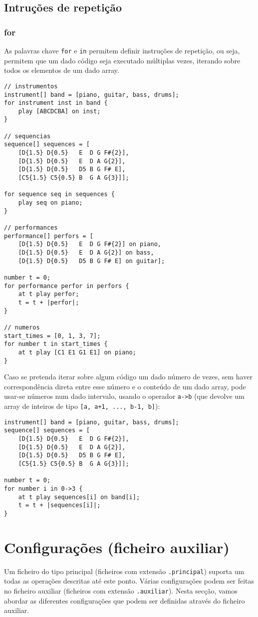 \documentclass{article}
\begin{document}
\subsection{Intruções de repetição}
\subsubsection{for}
As palavras chave \texttt{for} e \texttt{in} permitem definir instruções de repetição, ou seja, permitem que um dado código seja executado múltiplas vezes, iterando sobre todos os elementos de um dado array.
\begin{lstlisting} 
// instrumentos 
instrument[] band = [piano, guitar, bass, drums];
for instrument inst in band {
    play [ABCDCBA] on inst;
}

// sequencias
sequence[] sequences = [
    [D{1.5} D{0.5}   E  D G F#{2}], 
    [D{1.5} D{0.5}   E  D A G{2}],
    [D{1.5} D{0.5}   D5 B G F# E],
    [C5{1.5} C5{0.5} B  G A G{3}]];
    
for sequence seq in sequences {
    play seq on piano;
}
    
// performances
performance[] perfors = [
    [D{1.5} D{0.5}   E  D G F#{2}] on piano, 
    [D{1.5} D{0.5}   E  D A G{2}] on bass,
    [D{1.5} D{0.5}   D5 B G F# E] on guitar];
    
number t = 0;
for performance perfor in perfors {
    at t play perfor;
    t = t + |perfor|;
}

// numeros
start_times = [0, 1, 3, 7];
for number t in start_times {
    at t play [C1 E1 G1 E1] on piano;
}
\end{lstlisting}

Caso se pretenda iterar sobre algum código um dado número de vezes, sem haver correspondência direta entre esse número e o conteúdo de um dado array, pode usar-se números num dado intervalo, usando o operador \texttt{a->b} (que devolve um array de inteiros de tipo \texttt{[a, a+1, ..., b-1, b]}):
\begin{lstlisting} 
instrument[] band = [piano, guitar, bass, drums];
sequence[] sequences = [
    [D{1.5} D{0.5}   E  D G F#{2}], 
    [D{1.5} D{0.5}   E  D A G{2}],
    [D{1.5} D{0.5}   D5 B G F# E],
    [C5{1.5} C5{0.5} B  G A G{3}]];

number t = 0;
for number i in 0->3 {
    at t play sequences[i] on band[i];
    t = t + |sequences[i]|;
}
\end{lstlisting}

\section{Configurações (ficheiro auxiliar)} \label{config}
Um ficheiro do tipo principal (ficheiros com extensão \texttt{.principal}) suporta um todas as operações descritas até este ponto. 
Várias configurações podem ser feitas no ficheiro auxiliar (ficheiros com extensão \texttt{.auxiliar}). Nesta secção, vamos abordar as diferentes configurações que podem ser definidas através do ficheiro auxiliar.
\end{document}
